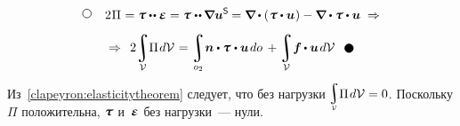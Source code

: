 \begin{otherlanguage}{russian}
\vspace{-0.64em}\begin{multline*}
\tikz[baseline=-1ex] \draw [line width=.5pt, color=black, fill=white] (0, 0) circle (.8ex);
\hspace{2.5ex}
2 \hspace{0.1ex} \Pi \hspace{0.1ex} = \mathboldtau \dotdotp \mathboldepsilon =
\mathboldtau \hspace{0.1ex} \dotdotp \hspace{-0.12ex} \boldnabla \bm{u}^{\mathsf{S}} \hspace{-0.12ex} =
\boldnabla \hspace{-0.1ex} \dotp \left( \hspace{0.1ex} \mathboldtau \dotp \bm{u} \hspace{0.1ex} \right) -
\tikzmark{beginMinusLoad} \boldnabla \dotp \mathboldtau \tikzmark{endMinusLoad} \dotp \bm{u} \;\Rightarrow \\[.5em]
\Rightarrow\;\,
\displaystyle 2 \hspace{-0.16em}
\integral\displaylimits_{\mathcal{V}} \hspace{-0.5ex} \Pi \hspace{0.2ex} d\mathcal{V} \hspace{.12ex} =
\integral\displaylimits_{o_2} \hspace{-0.4ex} \tikzmark{beginSurfaceLoad} \bm{n} \dotp \mathboldtau \tikzmark{endSurfaceLoad} \hspace{0.1ex} \dotp \bm{u} \hspace{0.25ex} do \hspace{.4ex} +
\integral\displaylimits_{\mathcal{V}} \hspace{-0.4ex} \bm{f} \hspace{-0.1ex} \dotp \bm{u} \hspace{0.25ex} d\mathcal{V}
\hspace{1.8ex}
\tikz[baseline=-0.6ex] \draw [color=black, fill=black] (0, 0) circle (.8ex);
\end{multline*}%
%

\vspace{-0.2em} Из~\eqref{clapeyron:elasticitytheorem} следует, что без нагрузки ${\hspace{-0.1ex}\raisemath{.15em}{\scalebox{0.75}{$\smash{\displaystyle\integral\limits_{\mathcal{V}}}$}} \Pi \hspace{0.2ex} d\mathcal{V} = 0}$. По\-сколь\-ку $\Pi$ положительна, $\mathboldtau$ и~$\mathboldepsilon$ без нагрузки~--- нули.


\end{otherlanguage}

